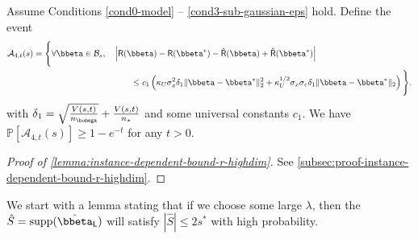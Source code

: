 \documentclass[10pt]{article}
\numberwithin{equation}{section}
\newcommand*{\supp}{\mathrm{supp}}
\begin{document}
\begin{lemma}
\label{lemma:instance-dependent-bound-r-highdim}
Assume Conditions \ref{cond0-model} -- \ref{cond3-sub-gaussian-eps} hold. Define the event
\begin{align}
\begin{split}
    \mathcal{A}_{4,t}(s) = \Bigg\{ \forall \bbeta \in \mathcal{B}_s, ~~ &~ \left|\mathsf{R}(\bbeta) - \mathsf{R}(\bbeta^*) - \hat{\mathsf{R}}(\bbeta) + \hat{\mathsf{R}}(\bbeta^*)\right| \\
    & ~~~~~~~ \le c_1 \left(\kappa_U \sigma_x^2 \delta_1 \|\bbeta - \bbeta^*\|_2^2 + \kappa_U^{1/2} \sigma_x \sigma_\varepsilon \delta_1 \|\bbeta - \bbeta^*\|_2 \right)\Bigg\}.
\end{split} 
\end{align} with $\delta_1 = \sqrt{\frac{V(s,t)}{n_{\bomega}}} + \frac{V(s,t)}{n_*}$ and some universal constants $c_1$. We have $\mathbb{P}[\mathcal{A}_{4,t}(s)] \ge 1-e^{-t}$ for any $t>0$.
\end{lemma}
\begin{proof}[Proof of \cref{lemma:instance-dependent-bound-r-highdim}]
    See \cref{subsec:proof-instance-dependent-bound-r-highdim}.
\end{proof}

We start with a lemma stating that if we choose some large $\lambda$, then the $\hat{S} = \supp(\hat{\bbeta}_{\mathsf{L}})$ will satisfy $|\hat{S}| \le 2s^*$ with high probability.
\end{document}
